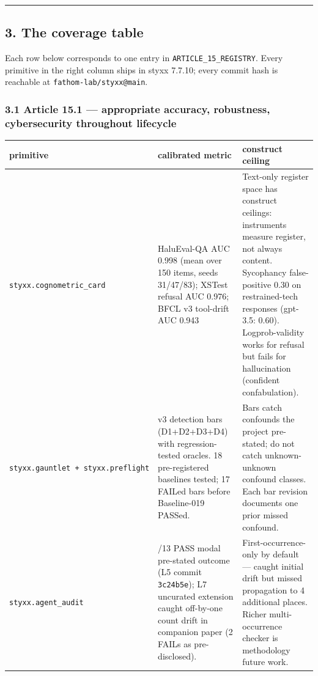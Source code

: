 \documentclass[
]{article}
\newcounter{none} %
\begin{document}
\begin{center}\rule{0.5\linewidth}{0.5pt}\end{center}

\subsection{3. The coverage table}\label{the-coverage-table}

Each row below corresponds to one entry in
\texttt{ARTICLE\_15\_REGISTRY}. Every primitive in the right column
ships in styxx 7.7.10; every commit hash is reachable at
\texttt{fathom-lab/styxx@main}.

\subsubsection{3.1 Article 15.1 --- appropriate accuracy, robustness,
cybersecurity throughout
lifecycle}\label{article-15.1-appropriate-accuracy-robustness-cybersecurity-throughout-lifecycle}

{\def\LTcaptype{none} %
\begin{longtable}[]{@{}
  >{\raggedright\arraybackslash}p{}
  >{\raggedright\arraybackslash}p{}
  >{\raggedright\arraybackslash}p{}@{}}
\toprule\noalign{}
\begin{minipage}[b]{\linewidth}\raggedright
primitive
\end{minipage} & \begin{minipage}[b]{\linewidth}\raggedright
calibrated metric
\end{minipage} & \begin{minipage}[b]{\linewidth}\raggedright
construct ceiling
\end{minipage} \\
\midrule\noalign{}
\endhead
\bottomrule\noalign{}
\endlastfoot
\texttt{styxx.cognometric\_card} & HaluEval-QA AUC 0.998 (mean over 150
items, seeds 31/47/83); XSTest refusal AUC 0.976; BFCL v3 tool-drift AUC
0.943 & Text-only register space has construct ceilings: instruments
measure register, not always content. Sycophancy false-positive 0.30 on
restrained-tech responses (gpt-3.5: 0.60). Logprob-validity works for
refusal but fails for hallucination (confident confabulation). \\
\texttt{styxx.gauntlet\ +\ styxx.preflight} & v3 detection bars
(D1+D2+D3+D4) with regression-tested oracles. 18 pre-registered
baselines tested; 17 FAILed bars before Baseline-019 PASSed. & Bars
catch confounds the project pre-stated; do not catch unknown-unknown
confound classes. Each bar revision documents one prior missed
confound. \\
\texttt{styxx.agent\_audit} & 13/13 PASS modal pre-stated outcome (L5
commit \texttt{3c24b5e}); L7 uncurated extension caught off-by-one count
drift in companion paper (2 FAILs as pre-disclosed). &
First-occurrence-only by default --- caught initial drift but missed
propagation to 4 additional places. Richer multi-occurrence checker is
methodology future work. \\
\end{longtable}
}
\end{document}
